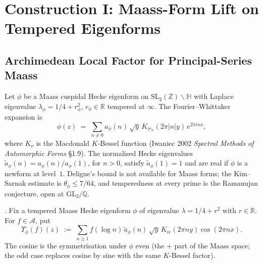 \section{Construction I: Maass-Form Lift on Tempered Eigenforms}
\label{v4-arith:w6-b:construction-I}

\subsection{Archimedean Local Factor for Principal-Series Maass}
\label{v4-arith:w6-b:construction-I:local}

Let \(\phi\) be a Maass cuspidal Hecke eigenform on
\(\mathrm{SL}_{2}(\mathbb{Z})\backslash\mathbb{H}\) with Laplace
eigenvalue \(\lambda_{\phi}=1/4+r_{\phi}^{2}\), \(r_{\phi}\in\mathbb{R}\)
tempered at \(\infty\). The Fourier--Whittaker expansion is
\begin{equation}
\label{v4-arith:w6-b:eq:maass-expansion}
\phi(z)
\;=\;\sum_{n\neq 0}a_{\phi}(n)\,\sqrt{y}\,K_{ir_{\phi}}(2\pi|n|y)\,e^{2\pi inx},
\end{equation}
where \(K_{\nu}\) is the Macdonald \(K\)-Bessel function (Iwaniec 2002
\emph{Spectral Methods of Automorphic Forms} \S1.9). The normalised
Hecke eigenvalues \(\widetilde{a}_{\phi}(n)=a_{\phi}(n)/a_{\phi}(1)\), for \(n>0\), satisfy
\(\widetilde{a}_{\phi}(1)=1\) and are real if \(\phi\) is a newform at
level~\(1\). Deligne's bound is not available for Maass forms; the
Kim--Sarnak estimate is \(\theta_{\phi}\leq 7/64\), and temperedness
at every prime is the Ramanujan conjecture, open at
\(\mathrm{GL}_{2}/\mathbb{Q}\).

\begin{definition}
\label{v4-arith:w6-b:def:upsilon-maass}
\ClaimStatusDefinitional. Fix a tempered Maass Hecke eigenform \(\phi\)
of eigenvalue \(\lambda=1/4+r^{2}\) with \(r\in\mathbb{R}\). For
$f\in\mathscr A$, put
\begin{equation}
\label{v4-arith:w6-b:eq:upsilon-maass}
\Upsilon_{\phi}(f)(z)
\;:=\;\sum_{n\geq 1}f(\log n)\,\widetilde{a}_{\phi}(n)\,\sqrt{y}\,K_{ir}(2\pi ny)\cos(2\pi nx).
\end{equation}
The cosine is the symmetrisation under \(\phi\) even (the \(+\) part of
the Maass space; the odd case replaces cosine by sine with the same $K$-Bessel factor).
\end{definition}


